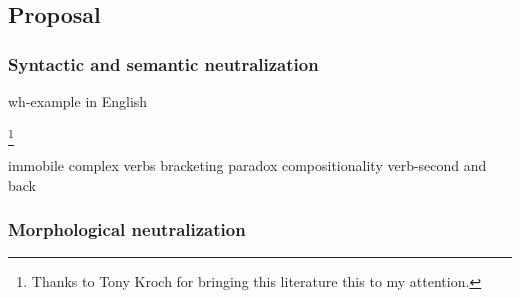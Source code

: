 \subsection{Proposal}

\citet{Downing2011}

\subsubsection{Syntactic and semantic neutralization}

\citet{Legendre2009}

wh-example in English


\footnote{Thanks to Tony Kroch for bringing this literature this to my attention.}

immobile complex verbs
bracketing paradox
compositionality
verb-second and back

\citet{Wunderlich1983}
\citet{Koopman1995}
\citet{McIntyre2002}
\citet{Dikken2003}
\citet{Muller2003}
\citet{Vikner2005}


\subsubsection{Morphological neutralization}

\citet{Anderson2010b}
